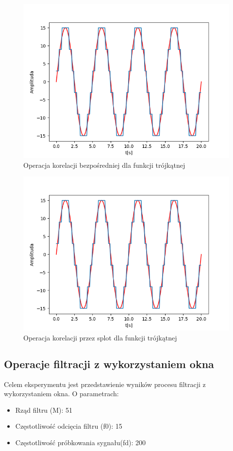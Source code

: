 \documentclass[12pt]{article}
\begin{document}
\begin{figure}[H]
\centering
\includegraphics[scale=0.6]{1sinusKwantStopien5.png}
\caption{Operacja korelacji bezpośredniej dla funkcji trójkątnej}
\end{figure}

\begin{figure}[H]
\centering
\includegraphics[scale=0.6]{1sinusKwantStopien5.png}
\caption{Operacja korelacji przez splot dla funkcji trójkątnej}
\end{figure}

\subsection{Operacje filtracji z wykorzystaniem okna}
Celem eksperymentu jest przedstawienie wyników procesu filtracji z wykorzystaniem okna. O parametrach:
\begin{itemize}
\item Rząd filtru (M): 51
\item Częstotliwość odcięcia filtru (f0): 15
\item Częstotliwość próbkowania sygnału(fd): 200
\end{itemize}
\end{document}
